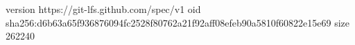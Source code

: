 version https://git-lfs.github.com/spec/v1
oid sha256:d6b63a65f936876094fc2528f80762a21f92aff08efeb90a5810f60822e15e69
size 262240
